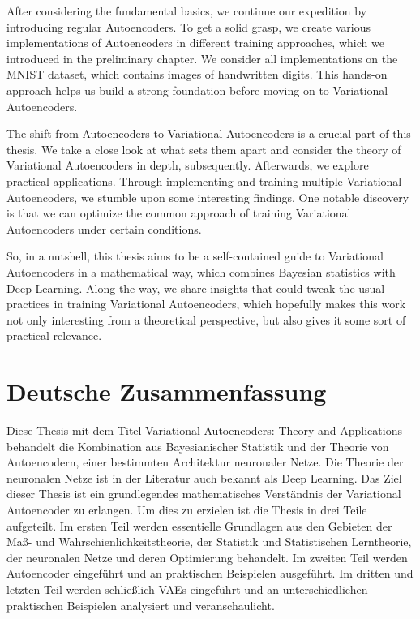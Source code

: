 \documentclass[11pt, twoside, a4paper]{book}
\theoremstyle{plain}
\theoremstyle{definition}
\theoremstyle{plain}
\begin{document}
After considering the fundamental basics, we continue our expedition by introducing regular Autoencoders. To get a solid grasp, we create various implementations of Autoencoders in different training approaches, which we introduced in the preliminary chapter. We consider all implementations on the MNIST dataset, which contains images of handwritten digits. This hands-on approach helps us build a strong foundation before moving on to Variational Autoencoders.

The shift from Autoencoders to Variational Autoencoders is a crucial part of this thesis. We take a close look at what sets them apart and consider the theory of Variational Autoencoders in depth, subsequently. Afterwards, we explore practical applications. Through implementing and training multiple Variational Autoencoders, we stumble upon some interesting findings. One notable discovery is that we can optimize the common approach of training Variational Autoencoders under certain conditions.

So, in a nutshell, this thesis aims to be a self-contained guide to Variational Autoencoders in a mathematical way, which combines Bayesian statistics with Deep Learning. Along the way, we share insights that could tweak the usual practices in training Variational Autoencoders, which hopefully makes this work not only interesting from a theoretical perspective, but also gives it some sort of practical relevance.








\newpage
{}

\section*{Deutsche Zusammenfassung}

Diese Thesis mit dem Titel \glqq Variational Autoencoders: Theory and Applications\grqq{} behandelt die Kombination aus Bayesianischer Statistik und der Theorie von Autoencodern, einer bestimmten Architektur neuronaler Netze. Die Theorie der neuronalen Netze ist in der Literatur auch bekannt als \glqq Deep Learning\grqq{}. Das Ziel dieser Thesis ist ein grundlegendes mathematisches Verständnis der Variational Autoencoder zu erlangen. Um dies zu erzielen ist die Thesis in drei Teile aufgeteilt. Im ersten Teil werden essentielle Grundlagen aus den Gebieten der Maß- und Wahrschienlichkeitstheorie, der Statistik und Statistischen Lerntheorie, der neuronalen Netze und deren Optimierung behandelt. Im zweiten Teil werden Autoencoder eingeführt und an praktischen Beispielen ausgeführt. Im dritten und letzten Teil werden schließlich VAEs eingeführt und an unterschiedlichen praktischen Beispielen analysiert und veranschaulicht.
\end{document}
